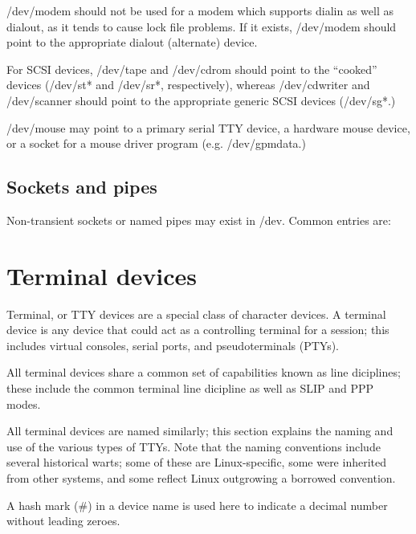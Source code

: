 \noindent
{\file /dev/modem} should not be used for a modem which supports
dialin as well as dialout, as it tends to cause lock file problems.
If it exists, {\file /dev/modem} should point to the appropriate
dialout (alternate) device.

For SCSI devices, {\file /dev/tape} and {\file /dev/cdrom} should
point to the ``cooked'' devices ({\file /dev/st*} and {\file
/dev/sr*}, respectively), whereas {\file /dev/cdwriter} and {\file
/dev/scanner} should point to the appropriate generic SCSI devices
({\file /dev/sg*}.)

{\file /dev/mouse} may point to a primary serial TTY device, a
hardware mouse device, or a socket for a mouse driver program
(e.g. {\file /dev/gpmdata}.)

\subsection{Sockets and pipes}

Non-transient sockets or named pipes may exist in {\file /dev}.
Common entries are:

\begin{nodelist}
\end{nodelist}

\section{Terminal devices}

Terminal, or TTY devices are a special class of character devices.  A
terminal device is any device that could act as a controlling terminal
for a session; this includes virtual consoles, serial ports, and
pseudoterminals (PTYs).

All terminal devices share a common set of capabilities known as line
diciplines; these include the common terminal line dicipline as well
as SLIP and PPP modes.

All terminal devices are named similarly; this section explains the
naming and use of the various types of TTYs.  Note that the naming
conventions include several historical warts; some of these are
Linux-specific, some were inherited from other systems, and some
reflect Linux outgrowing a borrowed convention.

A hash mark ($\#$) in a device name is used here to indicate a decimal
number without leading zeroes.

